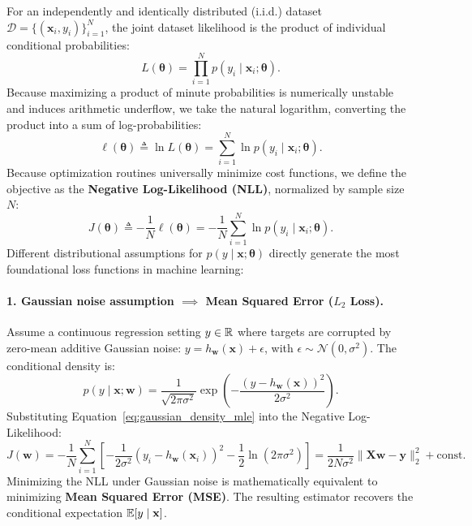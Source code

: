 For an independently and identically distributed (i.i.d.) dataset $\mathcal{D} = \{(\mathbf{x}_i, y_i)\}_{i=1}^N$, the joint dataset likelihood is the product of individual conditional probabilities:
\begin{equation}
L(\boldsymbol{\theta}) = \prod_{i=1}^N p(y_i \mid \mathbf{x}_i; \boldsymbol{\theta}).
\label{eq:dataset_likelihood_mle}
\end{equation}
Because maximizing a product of minute probabilities is numerically unstable and induces arithmetic underflow, we take the natural logarithm, converting the product into a sum of log-probabilities:
\begin{equation}
\ell(\boldsymbol{\theta}) \triangleq \ln L(\boldsymbol{\theta}) = \sum_{i=1}^N \ln p(y_i \mid \mathbf{x}_i; \boldsymbol{\theta}).
\label{eq:dataset_log_likelihood_mle}
\end{equation}
Because optimization routines universally minimize cost functions, we define the objective as the \textbf{Negative Log-Likelihood (NLL)}, normalized by sample size $N$:
\begin{equation}
J(\boldsymbol{\theta}) \triangleq -\frac{1}{N} \ell(\boldsymbol{\theta}) = -\frac{1}{N} \sum_{i=1}^N \ln p(y_i \mid \mathbf{x}_i; \boldsymbol{\theta}).
\label{eq:nll_objective_definition}
\end{equation}
Different distributional assumptions for $p(y \mid \mathbf{x}; \boldsymbol{\theta})$ directly generate the most foundational loss functions in machine learning:

\paragraph{1. Gaussian noise assumption $\implies$ Mean Squared Error ($L_2$ Loss).}
Assume a continuous regression setting $y \in \mathbb{R}$ where targets are corrupted by zero-mean additive Gaussian noise: $y = h_{\mathbf{w}}(\mathbf{x}) + \epsilon$, with $\epsilon \sim \mathcal{N}(0, \sigma^2)$. The conditional density is:
\begin{equation}
p(y \mid \mathbf{x}; \mathbf{w}) = \frac{1}{\sqrt{2\pi\sigma^2}} \exp\left( -\frac{(y - h_{\mathbf{w}}(\mathbf{x}))^2}{2\sigma^2} \right).
\label{eq:gaussian_density_mle}
\end{equation}
Substituting Equation~\eqref{eq:gaussian_density_mle} into the Negative Log-Likelihood:
\begin{equation}
J(\mathbf{w}) = -\frac{1}{N} \sum_{i=1}^N \left[ -\frac{1}{2\sigma^2}(y_i - h_{\mathbf{w}}(\mathbf{x}_i))^2 - \frac{1}{2}\ln(2\pi\sigma^2) \right] = \frac{1}{2N\sigma^2} \|\mathbf{X}\mathbf{w} - \mathbf{y}\|_2^2 + \text{const}.
\label{eq:mse_matrix_form}
\end{equation}
Minimizing the NLL under Gaussian noise is mathematically equivalent to minimizing \textbf{Mean Squared Error (MSE)}. The resulting estimator recovers the conditional expectation $\mathbb{E}[y \mid \mathbf{x}]$.

